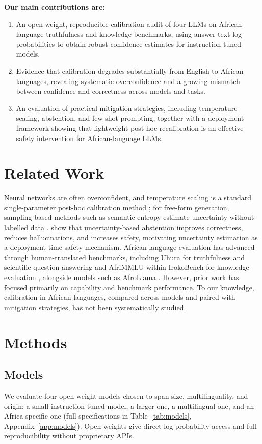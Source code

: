 \documentclass[pmlr]{jmlr}%
\begin{document}
\medskip
\noindent\textbf{Our main contributions are:}
\begin{enumerate}\itemsep1pt
  \item An open-weight, reproducible calibration audit of four LLMs on African-language truthfulness
  and knowledge benchmarks, using answer-text log-probabilities to obtain robust confidence estimates
  for instruction-tuned models.

  \item Evidence that calibration degrades substantially from English to African languages, revealing
  systematic overconfidence and a growing mismatch between confidence and correctness across models
  and tasks.

  \item An evaluation of practical mitigation strategies, including temperature scaling, abstention,
  and few-shot prompting, together with a deployment framework showing that lightweight post-hoc
  recalibration is an effective safety intervention for African-language LLMs.
\end{enumerate}

\section{Related Work}
Neural networks are often overconfident, and temperature scaling is a standard single-parameter
post-hoc calibration method \citep{guo2017}; for free-form generation, sampling-based methods such as
semantic entropy estimate uncertainty without labelled data \citep{kuhn2023}. \citet{tomani2024}
show that uncertainty-based abstention improves correctness, reduces hallucinations, and increases
safety, motivating uncertainty estimation as a deployment-time safety mechanism. African-language
evaluation has advanced through human-translated benchmarks, including Uhura for truthfulness and
scientific question answering \citep{uhura} and AfriMMLU within IrokoBench for knowledge evaluation
\citep{irokobench}, alongside models such as AfroLlama \citep{afrollama}. However, prior work has
focused primarily on capability and benchmark performance. To our knowledge, calibration in African
languages, compared across models and paired with mitigation strategies, has not been systematically
studied.

\section{Methods}

\subsection{Models}
We evaluate four open-weight models chosen to span size, multilinguality, and origin: a small
instruction-tuned model, a larger one, a multilingual one, and an Africa-specific one (full
specifications in Table~\ref{tab:models}, Appendix~\ref{app:models}). Open weights give direct
log-probability access and full reproducibility without proprietary APIs.
\end{document}
